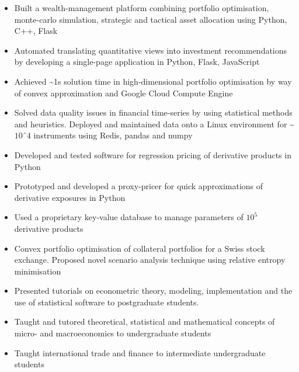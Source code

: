 \documentclass[10pt,a4paper,ragged2e]{altacv}
\begin{document}
\begin{paracol}{2}


\begin{itemize}
\item Built a wealth-management platform combining portfolio optimisation, monte-carlo simulation,
strategic and tactical asset allocation using Python, C++, Flask
\item Automated translating quantitative views into investment recommendations
by developing a single-page application in Python, Flask, JavaScript
\item Achieved \textasciitilde 1s solution time in high-dimensional portfolio optimisation by
way of convex approximation and Google Cloud Compute Engine 
\item Solved data quality issues in financial time-series by using statistical methods and heuristics. Deployed and maintained data onto a Linux environment for \textasciitilde $10ˆ4$ instruments using Redis, pandas and numpy

\end{itemize}

\divider

\begin{itemize}
\item Developed and tested software for regression pricing of derivative products in Python
\item Prototyped and developed a proxy-pricer for quick approximations of derivative exposures in Python
\item Used a proprietary key-value database to manage parameters of $10^5$ derivative products 
\item Convex portfolio optimisation of collateral portfolios for a Swiss stock exchange. Proposed novel scenario analysis technique using relative entropy minimisation
\end{itemize}

\divider

\begin{itemize}
\item Presented tutorials on econometric theory, modeling, implementation and the use of statistical software to postgraduate students. 
\item Taught and tutored theoretical, statistical and mathematical concepts of micro- and macroeconomics to undergraduate students
\item Taught international trade and finance to intermediate undergraduate students
\end{itemize}




\end{paracol}
\end{document}

